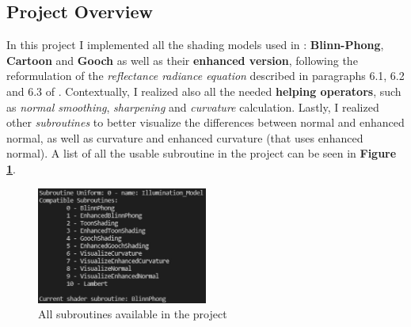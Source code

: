 \subsection{Project Overview}
In this project I implemented all the shading models used in \cite{referencePaper} :\newline
\textbf{Blinn-Phong}, \textbf{Cartoon} and \textbf{Gooch} as well as their \textbf{enhanced version}, following the reformulation of the \textit{reflectance radiance equation} described in paragraphs 6.1, 6.2 and 6.3 of \cite{referencePaper}. \newline Contextually, I realized also all the needed \textbf{helping operators}, such as \textit{normal smoothing}, \textit{sharpening} and \textit{curvature} calculation. Lastly, I realized other \textit{subroutines} to better visualize the differences between normal and enhanced normal, as well as curvature and enhanced curvature (that uses enhanced normal). \newline
A list of all the usable subroutine in the project can be seen in \textbf{Figure \ref{fig:all_subroutines}}.

\begin{figure}[h]
	\centering
	\includegraphics[width=0.5\textwidth]{Images/all_subroutines.jpg}
	\caption{All subroutines available in the project}
	\label{fig:all_subroutines}
\end{figure}